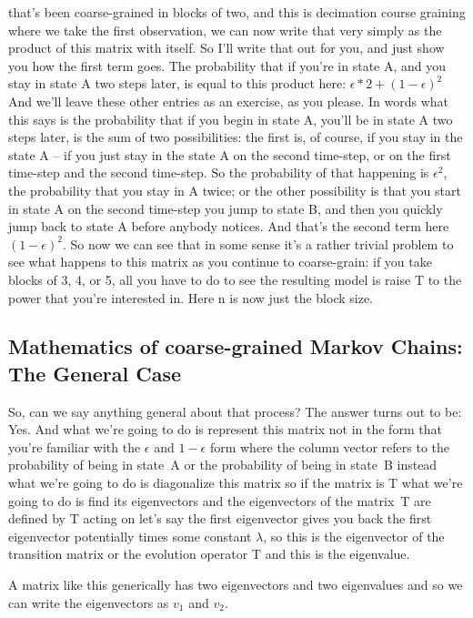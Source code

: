 \documentclass[]{article}
\begin{document}
that’s been coarse-grained
in blocks of two,
and this is decimation course graining
where we take the first observation,
we can now write that very simply
as the product of this matrix with itself.
So I'll write that out for you,
and just show you how the first term goes.
The probability that if you’re in state A,
and you stay in state A two steps later,
is equal to this product here:
$\epsilon*2 + (1-\epsilon)^2$
And we’ll leave these other entries
as an exercise, as you please.
In words what this says
is the probability
that if you begin in state A,
you’ll be in state A two steps later,
is the sum of two possibilities:
the first is, of course,
if you stay in the state A –
if you just stay in the state A
on the second time-step,
or on the first time-step
and the second time-step.
So the probability
of that happening is $\epsilon^2$,
the probability that you stay in A twice;
or the other possibility
is that you start in state A
on the second time-step
you jump to state B,
and then you quickly jump back
to state A before anybody notices.
And that’s the second term here $(1-\epsilon)^2$.
So now we can see that in some sense
it’s a rather trivial problem
to see what happens to this matrix
as you continue to coarse-grain:
if you take blocks of 3, 4, or 5,
all you have to do
to see the resulting model
is raise T to the power
that you’re interested in.
Here n is now just the block size.

\subsection{Mathematics of coarse-grained Markov Chains: The General Case }

So, can we say anything
general about that process?
The answer turns out to be: Yes.
And what we're going to do
is represent this matrix
not in the form
that you're familiar with
the $\epsilon$ and $1-\epsilon$ form
where the column vector refers to
the probability of being in state A
or the probability of being in state B
instead what we're going to do is
diagonalize this matrix
so if the matrix is T what we're
going to do is find its eigenvectors
and the eigenvectors
of the matrix T are defined
by T acting on let's say
the first eigenvector
gives you back the first eigenvector
potentially times some constant $\lambda$,
so this is the eigenvector
of the transition matrix or
the evolution operator T
and this is the eigenvalue.

A matrix like this generically has two
eigenvectors
and two
eigenvalues
and so we can write the eigenvectors
as $v_1$ and $v_2$.
\end{document}
